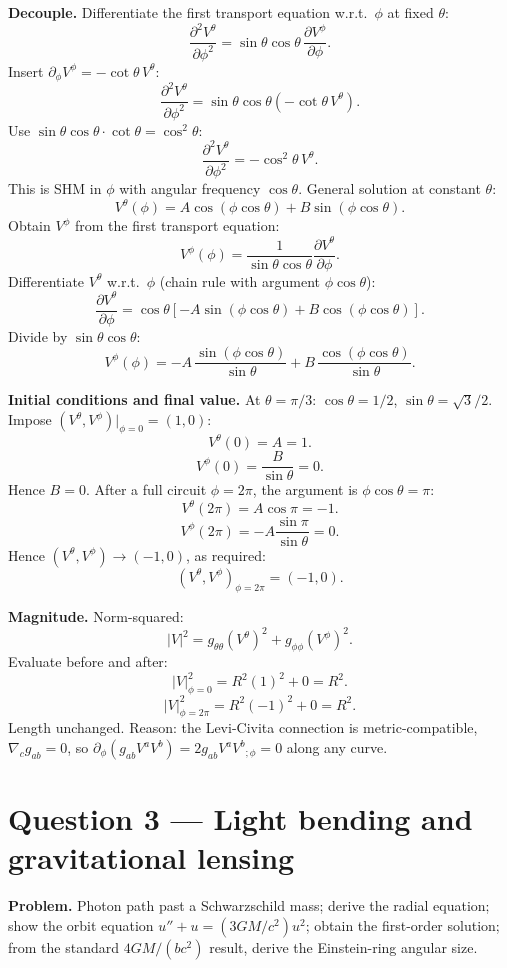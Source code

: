 \documentclass[11pt]{article}
\newcommand{\pd}[2]{\frac{\partial #1}{\partial #2}}
\newcommand{\pdd}[2]{\frac{\partial^{2} #1}{\partial #2^{2}}}
\begin{document}
\textbf{Decouple.} Differentiate the first transport equation w.r.t.\ $\phi$ at fixed $\theta$:
\[ \pdd{V^\theta}{\phi}=\sin\theta\cos\theta\,\pd{V^\phi}{\phi}. \]
Insert $\partial_\phi V^\phi=-\cot\theta\, V^\theta$:
\[ \pdd{V^\theta}{\phi}=\sin\theta\cos\theta\!\left(-\cot\theta\,V^\theta\right). \]
Use $\sin\theta\cos\theta\cdot\cot\theta=\cos^2\theta$:
\[ \pdd{V^\theta}{\phi}=-\cos^2\theta\,V^\theta. \]
This is SHM in $\phi$ with angular frequency $\cos\theta$. General solution at constant $\theta$:
\[ V^\theta(\phi)=A\cos(\phi\cos\theta)+B\sin(\phi\cos\theta). \]
Obtain $V^\phi$ from the first transport equation:
\[ V^\phi(\phi)=\frac{1}{\sin\theta\cos\theta}\pd{V^\theta}{\phi}. \]
Differentiate $V^\theta$ w.r.t.\ $\phi$ (chain rule with argument $\phi\cos\theta$):
\[ \pd{V^\theta}{\phi}=\cos\theta\!\left[-A\sin(\phi\cos\theta)+B\cos(\phi\cos\theta)\right]. \]
Divide by $\sin\theta\cos\theta$:
\begin{equation}
\boxed{\;V^\phi(\phi)=-A\,\frac{\sin(\phi\cos\theta)}{\sin\theta}+B\,\frac{\cos(\phi\cos\theta)}{\sin\theta}.\;}
\label{eq:Vphi}
\end{equation}

\textbf{Initial conditions and final value.} At $\theta=\pi/3$: $\cos\theta=1/2$, $\sin\theta=\sqrt 3/2$. Impose $(V^\theta,V^\phi)|_{\phi=0}=(1,0)$:
\[ V^\theta(0)=A=1. \]
\[ V^\phi(0)=\frac{B}{\sin\theta}=0. \]
Hence $B=0$. After a full circuit $\phi=2\pi$, the argument is $\phi\cos\theta=\pi$:
\[ V^\theta(2\pi)=A\cos\pi=-1. \]
\[ V^\phi(2\pi)=-A\frac{\sin\pi}{\sin\theta}=0. \]
Hence $(V^\theta,V^\phi)\to(-1,0)$, as required:
\[ \boxed{\;(V^\theta,V^\phi)_{\phi=2\pi}=(-1,0).\;} \]

\textbf{Magnitude.} Norm-squared:
\[ |V|^2=g_{\theta\theta}(V^\theta)^2+g_{\phi\phi}(V^\phi)^2. \]
Evaluate before and after:
\[ |V|^2_{\phi=0}=R^2(1)^2+0=R^2. \]
\[ |V|^2_{\phi=2\pi}=R^2(-1)^2+0=R^2. \]
Length unchanged. Reason: the Levi-Civita connection is metric-compatible, $\nabla_c g_{ab}=0$, so $\partial_\phi(g_{ab}V^a V^b)=2g_{ab}V^a V^b{}_{;\phi}=0$ along any curve.

\section*{Question 3 --- Light bending and gravitational lensing}

\textbf{Problem.} Photon path past a Schwarzschild mass; derive the radial equation; show the orbit equation $u''+u=(3GM/c^2)u^2$; obtain the first-order solution; from the standard $4GM/(bc^2)$ result, derive the Einstein-ring angular size.
\end{document}
